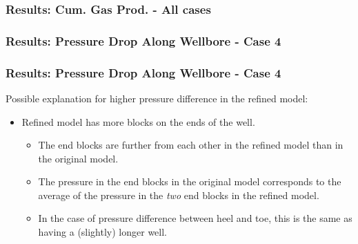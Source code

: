 

\begin{frame}
    \frametitle{Results: Cum. Gas Prod. - All cases}
    \centerline{}
\end{frame}

\begin{frame}
    \frametitle{Results: Pressure Drop Along Wellbore - Case 4}
    \centerline{}
\end{frame}

\begin{frame}
    \frametitle{Results: Pressure Drop Along Wellbore - Case 4}
    Possible explanation for higher pressure difference in the refined model:
    \begin{itemize}
        \item Refined model has more blocks on the ends of the well.
        \begin{itemize}
            \item The end blocks are further from each other in the refined model than in the original model.
            \item The pressure in the end blocks in the original model corresponds to the average of the pressure in the \emph{two} end blocks in the refined model.
            \item In the case of pressure difference between heel and toe, this is the same as having a (slightly) longer well.
        \end{itemize}
    \end{itemize}
\end{frame}

